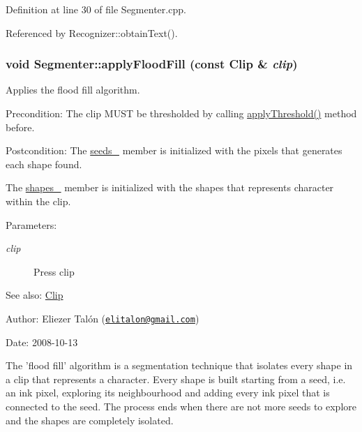 Definition at line 30 of file Segmenter.cpp.

Referenced by Recognizer::obtainText().\hypertarget{class_segmenter_327c88f2d55cb606a67ce778c06cf426}{
\subsubsection[applyFloodFill]{\setlength{\rightskip}{0pt plus 5cm}void Segmenter::applyFloodFill (const {\bf Clip} \& {\em clip})}}
\label{class_segmenter_327c88f2d55cb606a67ce778c06cf426}


Applies the flood fill algorithm. 

\begin{Desc}
\item[Precondition:]The clip MUST be thresholded by calling \hyperlink{class_segmenter_6854315e3320f9d9a8ece14cbb8570ee}{applyThreshold()} method before.\end{Desc}
\begin{Desc}
\item[Postcondition:]The \hyperlink{class_segmenter_48b7c2c842b26bebda9d0fc13cf81e58}{seeds\_\-} member is initialized with the pixels that generates each shape found. 

The \hyperlink{class_segmenter_3040cc000907ef44e820ddcf70de6f08}{shapes\_\-} member is initialized with the shapes that represents character within the clip.\end{Desc}
\begin{Desc}
\item[Parameters:]
\begin{description}
\item[{\em clip}]Press clip\end{description}
\end{Desc}
\begin{Desc}
\item[See also:]\hyperlink{class_clip}{Clip}\end{Desc}
\begin{Desc}
\item[Author:]Eliezer Talón (\href{mailto:elitalon@gmail.com}{\tt elitalon@gmail.com}) \end{Desc}
\begin{Desc}
\item[Date:]2008-10-13\end{Desc}
The 'flood fill' algorithm is a segmentation technique that isolates every shape in a clip that represents a character. Every shape is built starting from a seed, i.e. an ink pixel, exploring its neighbourhood and adding every ink pixel that is connected to the seed. The process ends when there are not more seeds to explore and the shapes are completely isolated. 

